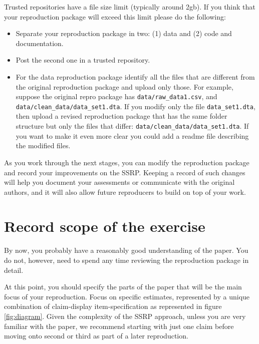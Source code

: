 \documentclass[
]{book}
\providecommand{\tightlist}{%
  \setlength{\itemsep}{0pt}\setlength{\parskip}{0pt}}
\begin{document}
Trusted repositories have a file size limit (typically around 2gb). If you think that your reproduction package will exceed this limit please do the following:

\begin{itemize}
\tightlist
\item
  Separate your reproduction package in two: (1) data and (2) code and documentation.\\
\item
  Post the second one in a trusted repository.\\
\item
  For the data reproduction package identify all the files that are different from the original reproduction package and upload only those. For example, suppose the original repro package has \texttt{data/raw\_data1.csv}, and \texttt{data/clean\_data/data\_set1.dta}. If you modify only the file \texttt{data\_set1.dta}, then upload a revised reproduction package that has the same folder structure but only the files that differ: \texttt{data/clean\_data/data\_set1.dta}. If you want to make it even more clear you could add a readme file describing the modified files.
\end{itemize}

As you work through the next stages, you can modify the reproduction package and record your improvements on the SSRP. Keeping a record of such changes will help you document your assessments or communicate with the original authors, and it will also allow future reproducers to build on top of your work.

\hypertarget{declare-estimates}{%
\section{Record scope of the exercise}\label{declare-estimates}}

By now, you probably have a reasonably good understanding of the paper. You do not, however, need to spend any time reviewing the reproduction package in detail.

At this point, you should specify the parts of the paper that will be the main focus of your reproduction. Focus on specific estimates, represented by a unique combination of claim-display item-specification as represented in figure \ref{fig:diagram}. Given the complexity of the SSRP approach, unless you are very familiar with the paper, we recommend starting with just one claim before moving onto second or third as part of a later reproduction.
\end{document}
